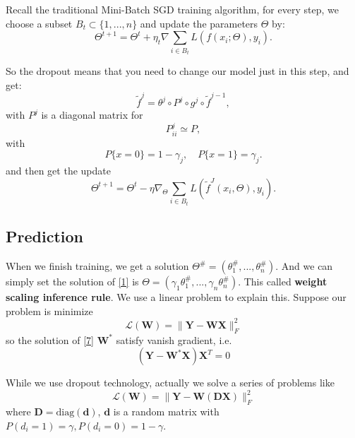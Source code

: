 Recall the traditional Mini-Batch SGD training algorithm, for every step, we choose a subset $B_t\subset \{1,...,n\}$ and update the parameters $\Theta$ by:
\begin{equation}
\Theta^{t+1} = \Theta^t + \eta_t\nabla \sum_{i \in B_t} L(f(x_i ;\Theta) ,y_i).
\end{equation}

So the dropout means that you need to change our model just in this step, and get:
\begin{equation}
\tilde{f}^{j} = \theta^j \circ P^j \circ g^j \circ \tilde f^{j-1},
\end{equation}
with $P^j$ is a diagonal matrix for
\begin{equation}
P^j_{ii} \simeq P,
\end{equation}
with
\begin{equation}
P\{x = 0 \} = 1-\gamma_j, \quad P\{x = 1 \} = \gamma_j.
\end{equation}
and then get the update
\begin{equation}
\Theta^{t+1} = \Theta^{t} - \eta \nabla_{\Theta} \sum_{i \in B_t} L(\tilde f^J(x_i, \Theta), y_i).
\end{equation}

\subsection{Prediction}
When we finish training, we get a solution $\Theta^\#=(\theta_1^\#,...,\theta_n^\#)$.
And we can simply set the solution of \eqref{1} is $\Theta = (\gamma_1 \theta_1^\#,...,\gamma_n \theta_n^\# )$. This called \textbf{weight scaling inference rule}.
We use a linear problem to explain this.
Suppose our problem is minimize
\begin{equation}\label{7}
\mathcal{L}(\mathbf{W})=\|\mathbf{Y}-\mathbf W\mathbf X\|_F^2
\end{equation}
so the solution of \eqref{7} $\mathbf W^*$ satisfy vanish gradient, i.e.
\begin{equation}\label{gradient}
(\mathbf Y-\mathbf W^*\mathbf X)\mathbf{X}^T=0
\end{equation}


While we use dropout technology, actually we solve a series of  problems like
\begin{equation}\label{10}
\mathcal{L}(\mathbf{W})=\|\mathbf{Y}-\mathbf W(\mathbf D\mathbf X)\|_F^2
\end{equation}
where $\mathbf D=\text{diag}(\mathbf d)$, $\mathbf d$ is a random matrix with $P(d_{i}=1)=\gamma,P(d_{i}=0  )=1-\gamma$.

